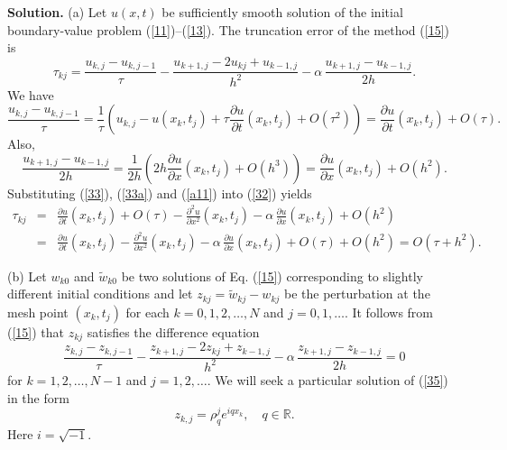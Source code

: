 \documentclass[10pt]{article}
\def\pr{{\partial}}
\begin{document}
\vskip 0.5cm
\noindent
{\bf Solution.} (a) Let $u(x, t)$ be sufficiently smooth solution of the initial boundary-value problem
(\ref{11})--(\ref{13}). The truncation error of the method (\ref{15}) is
\begin{equation}
\tau_{kj}=\frac{u_{k,j}-u_{k,j-1}}{\tau}-\frac{u_{k+1,j}-2u_{kj}+u_{k-1,j}}{h^{2}}
-\alpha \, \frac{u_{k+1,j}-u_{k-1,j}}{2h}.   \label{32}
\end{equation}
We have
\begin{equation}
\frac{u_{k,j}-u_{k,j-1}}{\tau}=\frac{1}{\tau}\left(
u_{k,j}-u(x_{k},t_{j})+\tau\frac{\pr u}{\pr t}(x_{k},t_{j})+O(\tau^{2})\right)=
\frac{\pr u}{\pr t}(x_{k},t_{j})+O(\tau).  \label{33}
\end{equation}
Also,
\begin{equation}
\frac{u_{k+1,j}-u_{k-1,j}}{2h}=\frac{1}{2h}\left(
2h\frac{\pr u}{\pr x}(x_{k},t_{j})+O(h^{3})\right)=
\frac{\pr u}{\pr x}(x_{k},t_{j})+O(h^2).  \label{33a}
\end{equation}
Substituting (\ref{33}), (\ref{33a}) and (\ref{a11}) into (\ref{32}) yields
\begin{eqnarray}
\tau_{kj}&=&\frac{\pr u}{\pr t}(x_{k},t_{j})+O(\tau)
-\frac{\pr^{2} u}{\pr x^{2}}(x_{k},t_{j}) -\alpha \, \frac{\pr u}{\pr x}(x_{k},t_{j})+O(h^{2}) \nonumber \\
&=&\frac{\pr u}{\pr t}(x_{k},t_{j})
-\frac{\pr^{2} u}{\pr x^{2}}(x_{k},t_{j}) -\alpha \, \frac{\pr u}{\pr x}(x_{k},t_{j})
+ O(\tau)+O(h^{2})=O(\tau+h^{2}). \nonumber   \label{34}
\end{eqnarray}

\vskip 0.2cm
\noindent
(b) Let $w_{k0}$ and $\tilde{w}_{k0}$ be two solutions of Eq. (\ref{15}) corresponding to slightly different
initial conditions and let $z_{kj}=\tilde{w}_{kj}-w_{kj}$ be
the perturbation at the mesh point $(x_{k}, t_{j})$ for each $k=0,1,2, \dots, N$ and $j=0,1, \dots$.
It follows from (\ref{15}) that $z_{kj}$ satisfies the difference equation
\begin{equation}
\frac{z_{k,j}-z_{k,j-1}}{\tau}-\frac{z_{k+1,j}-2z_{kj}+z_{k-1,j}}{h^{2}}
-\alpha \, \frac{z_{k+1,j}-z_{k-1,j}}{2h}=0 \label{35}
\end{equation}
for $k=1,2, \dots, N-1$ and $j=1,2, \dots$. We will seek a particular solution of
(\ref{35}) in the form
\begin{equation}
z_{k,j}=\rho_{q}^{j}e^{iqx_{k}}, \quad q\in{\mathbb R}. \label{29}
\end{equation}
Here $i=\sqrt{-1}$.
\end{document}
